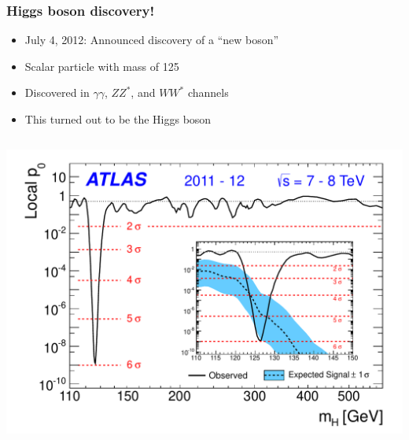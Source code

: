 \documentclass[10pt, svgnames]{beamer}
\begin{document}
\begin{frame}
  \frametitle{Higgs boson discovery!}
  \begin{itemize}
    \item July 4, 2012: Announced discovery of a ``new boson''
    \item Scalar particle with mass of 125~\GeV
    \item Discovered in $\gamma\gamma$, $ZZ^{*}$, and $WW^{*}$ channels
    \item This turned out to be the Higgs boson
  \end{itemize}
  \vspace{1ex}
  \begin{columns}
    \includegraphics[width=\textwidth]{figures/theory/figaux_109.pdf}
\end{columns}
\end{frame}
\end{document}
